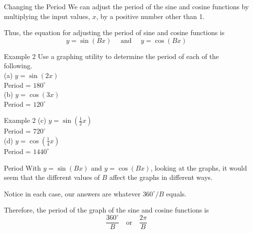\documentclass[t,usenames,dvipsnames]{beamer}
\begin{document}
\begin{frame}{Changing the Period}
We can adjust the period of the sine and cosine functions by multiplying the input values, $x$, by a positive number other than 1. \newline\\    \pause

Thus, the equation for adjusting the period of sine and cosine functions is
\[
y = \sin (Bx) \quad \text{ and } \quad y = \cos (Bx)
\]
\end{frame}

\begin{frame}{Example 2}
Use a graphing utility to determine the period of each of the following.   \newline\\  
(a) \quad $y = \sin(2x)$    \newline\\ \pause
Period = $180^\circ$    \newline\\  \pause
(b) \quad $y = \cos(3x)$    \newline\\ \pause
Period = $120^\circ$
\end{frame}

\begin{frame}{Example 2}
(c) \quad $y = \sin \left(\frac{1}{2} x\right)$ \newline\\  \pause
Period = $720^\circ$    \newline\\  \pause
(d) \quad $y = \cos \left(\frac{1}{4} x\right)$ \newline\\  \pause
Period = $1440^\circ$
\end{frame}

\begin{frame}{Period}
With $y = \sin(Bx)$ and $y = \cos(Bx)$, looking at the graphs, it would seem that the different values of $B$ affect the graphs in different ways.    \newline\\  \pause 

Notice in each case, our answers are whatever $360^\circ / B$ equals. \newline\\ \pause

Therefore, the period of the graph of the sine and cosine functions is
\[
\frac{360^\circ}{B} \quad \text{or} \quad \frac{2\pi}{B}
\]
\end{frame}
\end{document}
